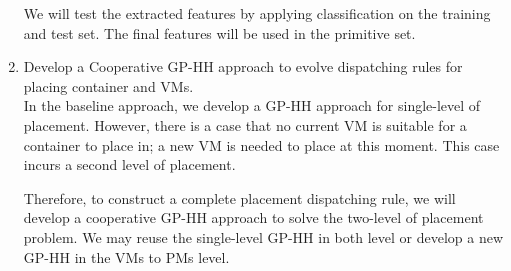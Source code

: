 \begin{enumerate}
	We will test the extracted features by applying classification on the training and test set. The final features will be used in the primitive set.



	\item Develop a Cooperative GP-HH approach to evolve dispatching rules for placing container and VMs. \\
	 In the baseline approach, we develop a GP-HH approach for single-level of placement. However, there is a case that no current VM is suitable for a container to place in; a new VM is needed to place at this moment. This case incurs a second level of placement. 

	Therefore, to construct a complete placement dispatching rule, we will develop a cooperative GP-HH approach to solve the two-level of placement problem. We may reuse the single-level GP-HH in both level or develop a new GP-HH in the VMs to PMs level.  


	\end{enumerate}


